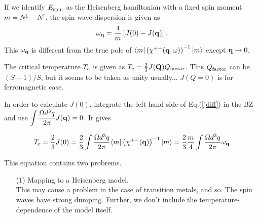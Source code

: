 \documentclass[a4paper,10pt,epsf,fleqn]{article}
\newcommand{\bfq}{{\bf q}}
\newcommand{\bfQ}{{\bf Q}}
\newcommand{\ds}{\displaystyle}
\newcommand{\ispone}{\downarrow}
\newcommand{\isptwo}{\uparrow}
\newcommand{\req}[1]{Eq.(\ref{#1})}
\begin{document}
{{{%

If we identify $ E_{\rm spin}$ as the Heisenberg hamiltonian
with a fixed spin moment $m = N^{\ispone}- N^{\isptwo}$,
the spin wave dispersion is given as
\begin{eqnarray}
\omega_\bfq = \frac{4}{m} \left[ J(0) -J(\bfq) \right].
\label{omegaq}
\end{eqnarray}
This $\omega_\bfq$ is different from the true pole of 
$\langle m| \left( \chi^{+-}(\bfq,\omega) \right)^{-1} |m \rangle$ 
 except
$\bfq \to 0$.

The critical temperature $T_{\rm c}$ is given as
$T_{\rm c} = \frac{2}{3} J(\bfQ) Q_{\rm factor}$.
This $Q_{\rm factor}$ can be $(S+1)/S$, but 
it seems to be taken as unity usually...
$J(Q=0)$ is for ferromagnetic case.

In order to calculate $J(0)$,
integrate the left hand side of Eq.(\ref{jdiff}) in the BZ
and use $\ds \int \frac{\Omega d^3 q}{2 \pi} J(\bfq)=0$. It gives

\begin{eqnarray}
T_{\rm c} = \frac{2}{3} J(0) = 
\frac{2}{3} \int \frac{\Omega d^3 q}{2 \pi}
\langle m| \left( \chi^{+-}(\bfq) \right)^{-1} |m \rangle 
= 
\frac{2}{3} \frac{m}{4} \int \frac{\Omega d^3 q}{2 \pi} \omega_\bfq 
\label{tceq}
\end{eqnarray}

This equation contains two probrems.
\begin{enumerate}
\item[(1)] Mapping to a Heisenberg model.\\
This may cause a problem in the case of transition metals, and so.
The spin waves have strong dumping.
Further, we don't include the temperature-dependence of the model itself.




\end{enumerate}}}}
\end{document}
